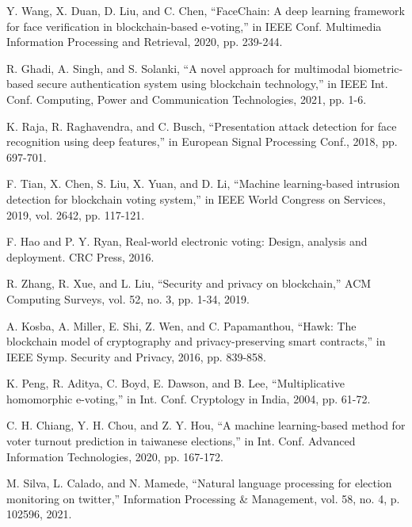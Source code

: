 \documentclass[conference]{IEEEtran}
\begin{document}
\begin{thebibliography}{00}
 Y. Wang, X. Duan, D. Liu, and C. Chen, ``FaceChain: A deep learning framework for face verification in blockchain-based e-voting,'' in IEEE Conf. Multimedia Information Processing and Retrieval, 2020, pp. 239-244.

 R. Ghadi, A. Singh, and S. Solanki, ``A novel approach for multimodal biometric-based secure authentication system using blockchain technology,'' in IEEE Int. Conf. Computing, Power and Communication Technologies, 2021, pp. 1-6.

 K. Raja, R. Raghavendra, and C. Busch, ``Presentation attack detection for face recognition using deep features,'' in European Signal Processing Conf., 2018, pp. 697-701.

 F. Tian, X. Chen, S. Liu, X. Yuan, and D. Li, ``Machine learning-based intrusion detection for blockchain voting system,'' in IEEE World Congress on Services, 2019, vol. 2642, pp. 117-121.

 F. Hao and P. Y. Ryan, Real-world electronic voting: Design, analysis and deployment. CRC Press, 2016.

 R. Zhang, R. Xue, and L. Liu, ``Security and privacy on blockchain,'' ACM Computing Surveys, vol. 52, no. 3, pp. 1-34, 2019.

 A. Kosba, A. Miller, E. Shi, Z. Wen, and C. Papamanthou, ``Hawk: The blockchain model of cryptography and privacy-preserving smart contracts,'' in IEEE Symp. Security and Privacy, 2016, pp. 839-858.

 K. Peng, R. Aditya, C. Boyd, E. Dawson, and B. Lee, ``Multiplicative homomorphic e-voting,'' in Int. Conf. Cryptology in India, 2004, pp. 61-72.

 C. H. Chiang, Y. H. Chou, and Z. Y. Hou, ``A machine learning-based method for voter turnout prediction in taiwanese elections,'' in Int. Conf. Advanced Information Technologies, 2020, pp. 167-172.

 M. Silva, L. Calado, and N. Mamede, ``Natural language processing for election monitoring on twitter,'' Information Processing & Management, vol. 58, no. 4, p. 102596, 2021.
\end{thebibliography}
\end{document}
